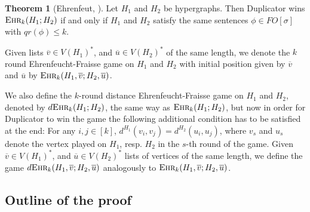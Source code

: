 \documentclass[12pt,notitlepage,a4paper]{article}
\theoremstyle{definition}
\newtheorem{theorem}{Theorem}[section]
\newcommand{\ehr}{\textsc{Ehr}}
\begin{document}
\begin{theorem}
	[Ehrenfeut, \citealp{ehrenfeucht1961application}] Let
	$H_1$ and $H_2$ be hypergraphs.
	Then Duplicator wins $\ehr_k(H_1;H_2)$
	if and only if $H_1$ and $H_2$ satisfy the same 
	sentences $\phi\in FO[\sigma]$ with $qr(\phi)\leq k$.		
\end{theorem}

Given lists $\overline{v}\in V(H_1)^*$, and 
$\overline{u}\in V(H_2)^*$ of the same length, 
we denote the $k$ round 
Ehrenfeucht-Fraisse game on $H_1$ and $H_2$ with initial position given
by $\overline{v}$ and $\overline{u}$ by $\ehr_k(H_1,\overline{v};H_2,\overline{u})$.\par

We also define the $k$-round distance Ehrenfeucht-Fraisse game on 
$H_1$ and $H_2$, denoted by $d\ehr_k(H_1;H_2)$, the same way as
$\ehr_k(H_1;H_2)$, but now in order for Duplicator to win the
game the following additional condition has to be satisfied 
at the end: For any $i,j\in [k]$, $d^{H_1}(v_i,v_j)=d^{H_2}(u_i,u_j)$,
where $v_s$ and $u_s$ denote the vertex played on $H_1$, resp. $H_2$ in the 
$s$-th round of the game. 
Given $\overline{v}\in V(H_1)^*$, and $\overline{u}\in V(H_2)^*$
lists of vertices of the same length,
we define the game 
$d\ehr_k(H_1,\overline{v};H_2,\overline{u})$ analogously to 
$\ehr_k(H_1,\overline{v};H_2,\overline{u})$.



\subsection{Outline of the proof}
\end{document}
